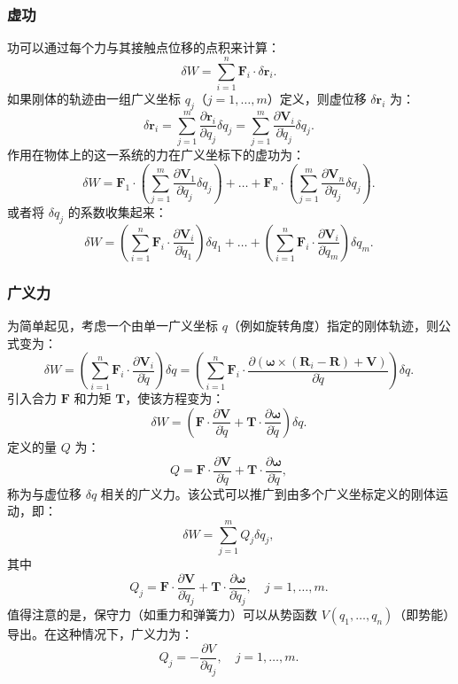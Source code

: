 \subsubsection{虚功}
功可以通过每个力与其接触点位移的点积来计算：
\[
\delta W = \sum_{i=1}^{n} \mathbf{F}_i \cdot \delta \mathbf{r}_i.~
\]
如果刚体的轨迹由一组广义坐标 \( q_j \)（\( j = 1, \dots, m \)）定义，则虚位移 \( \delta \mathbf{r}_i \) 为：
\[
\delta \mathbf{r}_i = \sum_{j=1}^{m} \frac{\partial \mathbf{r}_i}{\partial q_j} \delta q_j = \sum_{j=1}^{m} \frac{\partial \mathbf{V}_i}{\partial \dot{q}_j} \delta q_j.~
\]
作用在物体上的这一系统的力在广义坐标下的虚功为：
\[
\delta W = \mathbf{F}_1 \cdot \left( \sum_{j=1}^{m} \frac{\partial \mathbf{V}_1}{\partial \dot{q}_j} \delta q_j \right) + \dots + \mathbf{F}_n \cdot \left( \sum_{j=1}^{m} \frac{\partial \mathbf{V}_n}{\partial \dot{q}_j} \delta q_j \right).~
\]
或者将 \( \delta q_j \) 的系数收集起来：
\[
\delta W = \left( \sum_{i=1}^{n} \mathbf{F}_i \cdot \frac{\partial \mathbf{V}_i}{\partial \dot{q}_1} \right) \delta q_1 + \dots + \left( \sum_{i=1}^{n} \mathbf{F}_i \cdot \frac{\partial \mathbf{V}_i}{\partial \dot{q}_m} \right) \delta q_m.~
\]
\subsubsection{广义力}
为简单起见，考虑一个由单一广义坐标 \( q \)（例如旋转角度）指定的刚体轨迹，则公式变为：
\[
\delta W = \left( \sum_{i=1}^{n} \mathbf{F}_i \cdot \frac{\partial \mathbf{V}_i}{\partial \dot{q}} \right) \delta q = \left( \sum_{i=1}^{n} \mathbf{F}_i \cdot \frac{\partial (\boldsymbol{\omega} \times (\mathbf{R}_i - \mathbf{R}) + \mathbf{V})}{\partial \dot{q}} \right) \delta q.~
\]
引入合力 \( \mathbf{F} \) 和力矩 \( \mathbf{T} \)，使该方程变为：
\[
\delta W = \left( \mathbf{F} \cdot \frac{\partial \mathbf{V}}{\partial \dot{q}} + \mathbf{T} \cdot \frac{\partial \boldsymbol{\omega}}{\partial \dot{q}} \right) \delta q.~
\]
定义的量 \( Q \) 为：
\[
Q = \mathbf{F} \cdot \frac{\partial \mathbf{V}}{\partial \dot{q}} + \mathbf{T} \cdot \frac{\partial \boldsymbol{\omega}}{\partial \dot{q}},~
\]
称为与虚位移 \( \delta q \) 相关的广义力。该公式可以推广到由多个广义坐标定义的刚体运动，即：
\[
\delta W = \sum_{j=1}^{m} Q_j \delta q_j,~
\]
其中
\[
Q_j = \mathbf{F} \cdot \frac{\partial \mathbf{V}}{\partial \dot{q}_j} + \mathbf{T} \cdot \frac{\partial \boldsymbol{\omega}}{\partial \dot{q}_j}, \quad j=1, \dots, m.~
\]
值得注意的是，保守力（如重力和弹簧力）可以从势函数 \( V(q_1, \dots, q_n) \)（即势能）导出。在这种情况下，广义力为：
\[
Q_j = -\frac{\partial V}{\partial q_j}, \quad j=1, \dots, m.~
\]

